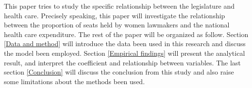 This paper tries to study the specific relationship between the legislature and health care.
Precisely speaking, this paper will investigate the relationship between the proportion of seats held by women lawmakers and the national health care expenditure.
The rest of the paper will be organized as follow.
Section \ref{Data and method} will introduce the data been used in this research and discuss the model been employed.
Section \ref{Empirical findings} will present the analytical result, and interpret the coefficient and relationship between variables.
The last section \ref{Conclusion} will discuss the conclusion from this study and also raise some limitations about the methods been used. 

